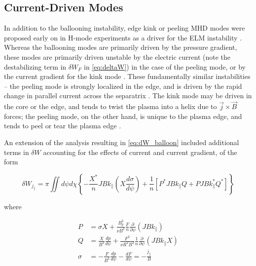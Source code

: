 \subsection{Current-Driven Modes}\label{subsec:mod_peel}

In addition to the ballooning instability, edge kink or peeling MHD modes were proposed early on in H-mode experiments as a driver for the ELM instability \cite{Keilhacker1984,Zohm1996}.  Whereas the ballooning modes are primarily driven by the pressure gradient, these modes are primarily driven unstable by the electric current (note the destabilizing term in $\delta W_F$ in \cref{eq:deltaW}) in the case of the peeling mode, or by the current gradient for the kink mode \cite{Wilson2006}.  These fundamentally similar instabilities -- the peeling mode is strongly localized in the edge, and is driven by the rapid change in parallel current across the separatrix \cite{Wilson2006,Connor1998a}.  The kink mode may be driven in the core or the edge, and tends to twist the plasma into a helix due to $\vec{j} \times \vec{B}$ forces; the peeling mode, on the other hand, is unique to the plasma edge, and tends to peel or tear the plasma edge \cite{Wilson1999}.

An extension of the analysis resulting in \cref{eq:dW_balloon} \cite{Connor1979} included additional terms in $\delta W$ accounting for the effects of current and current gradient, of the form

\begin{equation}\label{eq:dW_balloon_current}
  \delta W_{j_\parallel} = \pi \iint d\psi d\chi \left\{ - \frac{X^*}{n} JB k_\parallel \left( X \frac{d \sigma}{d \psi} \right) + \frac{1}{n} \left[ P^* JB k_\parallel Q + PJBk_\parallel^* Q^* \right] \right\}
\end{equation}

\noindent where

\begin{equation}\label{eq:dW_current_defs}
 \begin{aligned}
  P &= \sigma X + \frac{B_p^2}{\nu B^2} \frac{F}{n} \frac{\partial}{\partial \psi} \left( JBk_\parallel \right)\\
  Q &= \frac{X}{B^2} \frac{dp}{d\psi} + \frac{F^2}{\nu R^2 B^2} \frac{1}{n} \frac{\partial}{\partial \psi} \left( JBk_\parallel X \right)\\
  \sigma &= -\frac{F}{B^2} \frac{dp}{d\psi} - \frac{dF}{d\psi} = -\frac{j_\parallel}{B}
 \end{aligned}
\end{equation}


